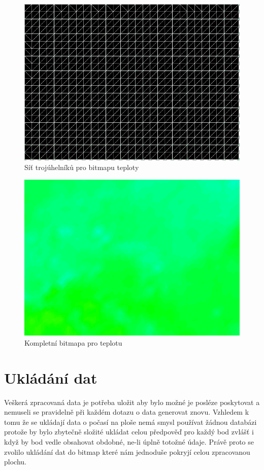 \documentclass[czech,bachelor,dept460,male,csharp,cpdeclaration]{diploma}
\begin{document}
	\begin{figure}
		\centering
		\includegraphics[scale=0.5]{Data/bmp_sit.png}
		\caption{Síť trojúhelníků pro bitmapu teploty}
	\end{figure}
	
	\begin{figure}
		\centering
		\includegraphics[scale=0.5]{Data/bmp_vybarvena.png}
		\caption{Kompletní bitmapa pro teplotu}
	\end{figure}
	
	\section{Ukládání dat}
	
	Veškerá zpracovaná data je potřeba uložit aby bylo možné je posléze poskytovat a nemuseli se pravidelně při každém dotazu o data generovat znovu. Vzhledem k tomu že se ukládají data o počasí na ploše nemá smysl používat žádnou databázi protože by bylo zbytečně složité ukládat celou předpověď pro každý bod zvlášť i když by bod vedle obsahovat obdobné, ne-li úplně totožné údaje. Právě proto se zvolilo ukládání dat do bitmap které nám jednoduše pokryjí celou zpracovanou plochu.
	
\end{document}
